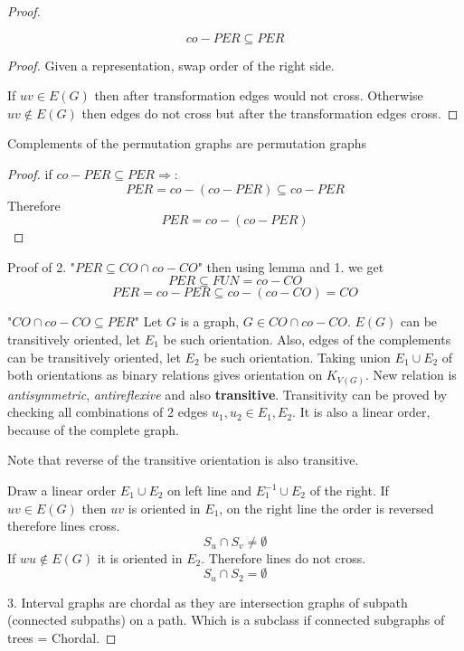 \begin{proof}
	\begin{lemma}
		\[ co-PER \subseteq PER \]
	\end{lemma}
	\begin{proof}
		Given a representation, swap order of the right side.

		If $uv \in E(G)$ then after transformation edges would not cross.
		Otherwise $uv \notin E(G)$ then edges do not cross but after the transformation edges cross.
	\end{proof}

	\begin{consequence}
		Complements of the permutation graphs are permutation graphs
	\end{consequence}
	\begin{proof}
		if $co-PER \subseteq PER \Rightarrow$:
		\[ PER = co-(co-PER) \subseteq co-PER \]
		Therefore
		\[ PER = co-(co-PER) \]
	\end{proof}

	Proof of 2.
	"$PER \subseteq CO \cap co-CO$" then using lemma and 1. we get
	\[ PER \subseteq FUN = co-CO \]
	\[ PER = co-PER \subseteq co-(co-CO) = CO \]

	"$CO \cap co-CO \subseteq PER$" Let $G$ is a graph, $G \in CO \cap co-CO$.
	$E(G)$ can be transitively oriented, let $E_1$ be such orientation.
	Also, edges of the complements can be transitively oriented, let $E_2$ be such orientation.
	Taking union $E_1 \cup E_2$ of both orientations as binary relations gives orientation on $K_{V(G)}$.
	New relation is \emph{antisymmetric}, \emph{antireflexive} and also \textbf{transitive}.
	Transitivity can be proved by checking all combinations of 2 edges $u_1,u_2 \in E_1, E_2$.
	It is also a linear order, because of the complete graph.

	\begin{observation}
		Note that reverse of the transitive orientation is also transitive.
	\end{observation}

	Draw a linear order $E_1 \cup E_2$ on left line and $E_1^{-1} \cup E_2$ of the right.
	If $uv \in E(G)$ then $uv$ is oriented in $E_1$, on the right line the order is reversed therefore lines cross.
	\[ S_u \cap S_v \ne \emptyset \]
	If $wu \notin E(G)$ it is oriented in $E_2$.
	Therefore lines do not cross.
	\[ S_u \cap S_2 = \emptyset \]

	3. Interval graphs are chordal as they are intersection graphs of subpath (connected subpaths) on a path.
	Which is a subclass if connected subgraphs of trees = Chordal.


\end{proof}
